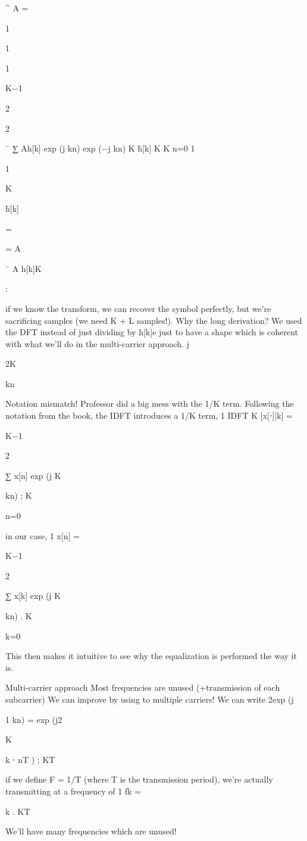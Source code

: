 {^
A =

1

1

1

K−1

2\pi

2\pi

¯
∑ Ah[k] exp (j kn) exp (−j kn)
K h̄[k]
K K n=0 1

1

K

h̄[k]

=

= A

¯
A h[k]K

:

if we know the transform, we can recover the symbol perfectly, but we're sacrificing samples (we need K + L samples!).
​Why the long derivation?
We used the DFT instead of just dividing by h[k]e just to have a shape which is coherent with what we'll do in the multi-carrier approach.
j

2\pi K

kn

​Notation mismatch!
Professor did a big mess with the 1/K term.
Following the notation from the book, the IDFT introduces a 1/K term,
1 IDFT K [x[⋅]|k] =

K−1

2\pi

∑ x[n] exp (j K

kn) ;
K

n=0

in our case,
1 x[n] =

K−1

2\pi

∑ x[k] exp (j K

kn) .
K

k=0

This then makes it intuitive to see why the equalization is performed the way it is.

Multi-carrier approach Most frequencies are unused (+transmission of each subcarrier)
We can improve by using to multiple carriers!
We can write 2\pi exp (j

1 kn) = exp (j2\pi

K

k ⋅ nT ) ;
KT

if we define F = 1/T (where T is the transmission period), we're actually transmitting at a frequency of 1 fk =

k .
KT

We'll have many frequencies which are unused!

}
